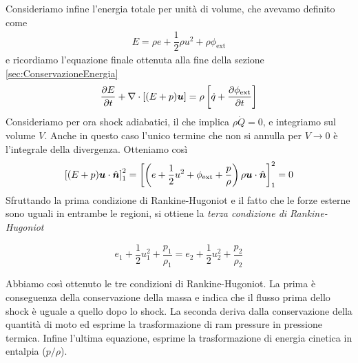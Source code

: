 Consideriamo infine l'energia totale per unità di volume, che avevamo definito come 
\begin{align*}
E = \rho e + \dfrac{1}{2}\rho u^2 + \rho \phi_\mathrm{ext}
\end{align*}
e ricordiamo l'equazione finale ottenuta alla fine della sezione \ref{sec:ConservazioneEnergia}
\begin{equation}
\frac{\partial E}{\partial t} + \V{\nabla} \cdot \left[ (E+p)\V{u} \right] = \rho \left[ \dot{q} + \frac{\partial \phi_\mathrm{ext}}{\partial t} \right]
\end{equation}
Consideriamo per ora shock adiabatici, il che implica $\rho \dot{Q}=0$, e integriamo sul volume $V$. Anche in questo caso l'unico termine che non si annulla per $V\rightarrow 0$ è l'integrale della divergenza. Otteniamo così
\begin{align*}
\left[ (E + p) \scal{u}{\hat{n}} \right]_1^2 = \left[ \left( e + \dfrac{1}{2}u^2 + \phi_\mathrm{ext} + \dfrac{p}{\rho} \right)\rho \scal{u}{\hat{n}} \right]_1^2 = 0
\end{align*}
Sfruttando la prima condizione di Rankine-Hugoniot e il fatto che le forze esterne sono uguali in entrambe le regioni, si ottiene la \textit{terza condizione di Rankine-Hugoniot}
\begin{EQ}
\begin{equation}
e_1 + \dfrac{1}{2}u_1^2 + \dfrac{p_1}{\rho_1} = e_2 + \dfrac{1}{2}u_2^2 + \dfrac{p_2}{\rho_2}
\end{equation}
\end{EQ}
Abbiamo così ottenuto le tre condizioni di Rankine-Hugoniot. La prima è conseguenza della conservazione della massa e indica che il flusso prima dello shock è uguale a quello dopo lo shock. La seconda deriva dalla conservazione della quantità di moto ed esprime la trasformazione di ram pressure in pressione termica. Infine l'ultima equazione, esprime la trasformazione di energia cinetica in entalpia ($p/\rho$).

